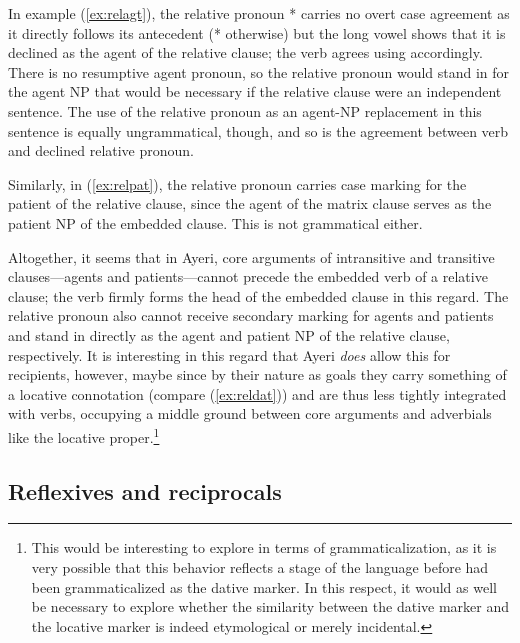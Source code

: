 In example (\ref{ex:relagt}), the relative pronoun * carries 
no overt case agreement as it directly follows its antecedent 
(* otherwise) but the long vowel shows that it is declined 
as the agent of the relative clause; the verb agrees using  
accordingly. There is no resumptive agent pronoun, so the relative pronoun 
would stand in for the agent NP that would be necessary if the relative clause 
were an independent sentence. The use of the relative pronoun as an agent-NP 
replacement in this sentence is equally ungrammatical, though, and so is the 
agreement between verb and declined relative pronoun.

Similarly, in (\ref{ex:relpat}), the relative pronoun carries case marking for 
the patient of the relative clause, since the agent of the matrix clause serves 
as the patient NP of the embedded clause. This is not grammatical either.

Altogether, it seems that in Ayeri, core arguments of intransitive and 
transitive clauses---agents and patients---cannot precede the embedded verb of 
a relative clause; the verb firmly forms the head of the embedded clause in 
this regard. The relative pronoun also cannot receive secondary marking for 
agents and patients and stand in directly as the agent and patient NP of the 
relative clause, respectively. It is interesting in this regard that Ayeri 
\emph{does} allow this for recipients, however, maybe since by their nature as 
goals they carry something of a locative connotation (compare (\ref{ex:reldat})) 
and are thus less tightly integrated with verbs, occupying a middle ground 
between core arguments and adverbials like the locative proper.\footnote{This 
would be interesting to explore in terms of grammaticalization, as it is very 
possible that this behavior reflects a stage of the language before 
 had been grammaticalized as the dative marker. In this 
respect, it would as well be necessary to explore whether the similarity between 
the dative marker  and the locative marker  is 
indeed etymological or merely incidental.}


\subsection{Reflexives and reciprocals}



